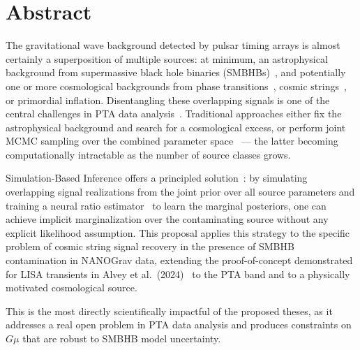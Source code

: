 \section{Abstract}\label{sec:4-abstract}
The gravitational wave background detected by pulsar timing arrays is almost certainly a superposition of multiple sources: at minimum, an astrophysical background from supermassive black hole binaries (SMBHBs)~\cite{sesana_insights_2013}, and potentially one or more cosmological backgrounds from phase transitions~\cite{caprini_detecting_2020}, cosmic strings~\cite{ellis_cosmic_2023}, or primordial inflation.
Disentangling these overlapping signals is one of the central challenges in PTA data analysis~\cite{afzal_nanograv_2023}.
Traditional approaches either fix the astrophysical background and search for a cosmological excess, or perform joint MCMC sampling over the combined parameter space~\cite{mitridate_ptarcade_2023a,ellis_enterprise_2020} — the latter becoming computationally intractable as the number of source classes grows.

Simulation-Based Inference offers a principled solution~\cite{cranmer_frontier_2020}: by simulating overlapping signal realizations from the joint prior over all source parameters and training a neural ratio estimator~\cite{miller_truncated_2021} to learn the marginal posteriors, one can achieve implicit marginalization over the contaminating source without any explicit likelihood assumption.
This proposal applies this strategy to the specific problem of cosmic string signal recovery in the presence of SMBHB contamination in NANOGrav data, extending the proof-of-concept demonstrated for LISA transients in Alvey et al.~(2024)~\cite{alvey_simulationbased_2024} to the PTA band and to a physically motivated cosmological source.

This is the most directly scientifically impactful of the proposed theses, as it addresses a real open problem in PTA data analysis and produces constraints on $G\mu$ that are robust to SMBHB model uncertainty.

